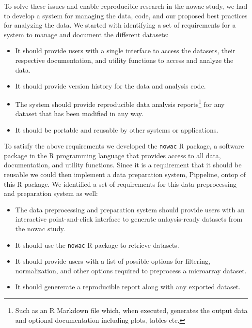To solve these issues and enable reproducible research in the \gls{nowac} study,
we had to develop a system for managing the data, code, and our proposed best
practices for analyzing the data. We started with identifying a set of
requirements for a system to manage and document the different datasets: 

\begin{itemize} 
    \item It should provide users with a single interface to access the
        datasets, their respective documentation, and utility functions to
        access and analyze the data.
    \item It should provide version history for the data and analysis code. 
    \item The system should provide reproducible data analysis
        reports\footnote{Such as an R Markdown file which, when executed,
        generates the output data and optional documentation including plots,
        tables etc.} for any dataset that has been modified in any way. 
    \item It should be portable and reusable by other systems or applications. 
\end{itemize} 

To satisfy the above requirements we developed the \texttt{nowac} R package, a
software package in the R programming language that provides access to all data,
documentation, and utility functions. Since it is a requirement that it should
be reusable we could then implement a data preparation system, Pippeline, ontop
of this R package. We identified a set of requirements for this data
preprocessing and preparation system as well: 

\begin{itemize} 
    \item The data preprocessing and preparation system should provide users
        with an interactive point-and-click interface to generate anlaysis-ready
        datasets from the \gls{nowac} study. 
    \item It should use the \texttt{nowac} R package to retrieve datasets. 
    \item It should provide users with a list of possible options for filtering,
        normalization, and other options required to preprocess a microarray
        dataset.
    \item It should genererate a reproducible report along with any exported
        dataset.
\end{itemize} 

